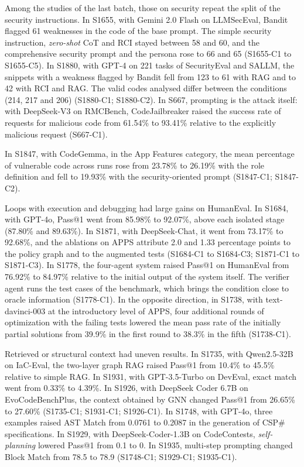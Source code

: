 Among the studies of the last batch, those on security repeat the split of the security instructions.
In S1655, with Gemini 2.0 Flash on LLMSecEval, Bandit flagged 61 weaknesses in the code of the base prompt. The
simple security instruction, \textit{zero-shot} CoT and RCI stayed between 58 and 60, and the comprehensive security
prompt and the persona rose to 66 and 65 (S1655-C1 to S1655-C5).
In S1880, with GPT-4 on 221 tasks of SecurityEval and SALLM, the snippets with a weakness flagged by Bandit fell from
123 to 61 with RAG and to 42 with RCI and RAG. The valid codes analysed differ between the conditions (214, 217 and 206)
(S1880-C1; S1880-C2).
In S667, prompting is the attack itself: with DeepSeek-V3 on RMCBench, CodeJailbreaker raised the success rate
of requests for malicious code from 61.54\% to 93.41\% relative to the explicitly malicious request (S667-C1).

In S1847, with CodeGemma, in the App Features category, the mean percentage of vulnerable code across runs rose
from 23.78\% to 26.19\% with the role definition and fell to 19.93\% with the security-oriented prompt (S1847-C1;
S1847-C2).

Loops with execution and debugging had large gains on HumanEval. In S1684, with GPT-4o, Pass@1 went from 85.98\%
to 92.07\%, above each isolated stage (87.80\% and 89.63\%). In S1871, with DeepSeek-Chat, it went from 73.17\% to
92.68\%, and the ablations on APPS attribute 2.0 and 1.33 percentage points to the policy graph and to the augmented tests (S1684-C1 to
S1684-C3; S1871-C1 to S1871-C3).
In S1778, the four-agent system raised Pass@1 on HumanEval from 76.92\% to 84.97\% relative to the initial
output of the system itself. The verifier agent runs the test cases of the benchmark, which brings the
condition close to oracle information (S1778-C1).
In the opposite direction, in S1738, with text-davinci-003 at the introductory level of APPS, four additional rounds of
optimization with the failing tests lowered the mean pass rate of the initially partial solutions from
39.9\% in the first round to 38.3\% in the fifth (S1738-C1).

Retrieved or structural context had uneven results. In S1735, with Qwen2.5-32B on IaC-Eval, the two-layer graph
RAG raised Pass@1 from 10.4\% to 45.5\% relative to simple RAG. In S1931, with GPT-3.5-Turbo on
DevEval, exact match went from 0.33\% to 4.39\%. In S1926, with DeepSeek Coder 6.7B on EvoCodeBenchPlus,
the context obtained by GNN changed Pass@1 from 26.65\% to 27.60\% (S1735-C1; S1931-C1; S1926-C1).
In S1748, with GPT-4o, three examples raised AST Match from 0.0761 to 0.2087 in the generation of CSP\# specifications.
In S1929, with DeepSeek-Coder-1.3B on CodeContests, \textit{self-planning} lowered Pass@1 from 0.1 to 0. In
S1935, multi-step prompting changed Block Match from 78.5 to 78.9 (S1748-C1; S1929-C1; S1935-C1).

